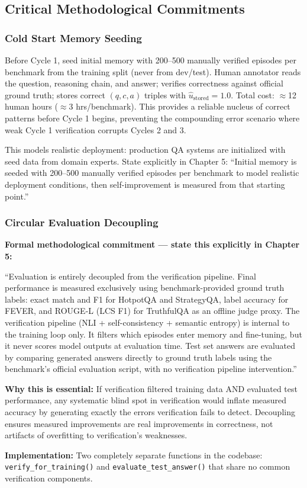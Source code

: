 \documentclass[12pt,a4paper]{article}
\theoremstyle{definition}
\newcommand{\ustored}{\hat{u}_{\text{stored}}}
\begin{document}
\subsection{Critical Methodological Commitments}

\subsubsection{Cold Start Memory Seeding}

Before Cycle 1, seed initial memory with 200--500 manually verified episodes per benchmark from the training split (never from dev/test). Human annotator reads the question, reasoning chain, and answer; verifies correctness against official ground truth; stores correct $(q, c, a)$ triples with $\ustored = 1.0$. Total cost: $\approx$12 human hours ($\approx$3 hrs/benchmark). This provides a reliable nucleus of correct patterns before Cycle 1 begins, preventing the compounding error scenario where weak Cycle 1 verification corrupts Cycles 2 and 3.

This models realistic deployment: production QA systems are initialized with seed data from domain experts. State explicitly in Chapter 5: ``Initial memory is seeded with 200--500 manually verified episodes per benchmark to model realistic deployment conditions, then self-improvement is measured from that starting point.''

\subsubsection{Circular Evaluation Decoupling}

\begin{designbox}
\textbf{Formal methodological commitment — state this explicitly in Chapter 5:}

``Evaluation is entirely decoupled from the verification pipeline. Final performance is measured exclusively using benchmark-provided ground truth labels: exact match and F1 for HotpotQA and StrategyQA, label accuracy for FEVER, and ROUGE-L (LCS F1) for TruthfulQA as an offline judge proxy. The verification pipeline (NLI + self-consistency + semantic entropy) is internal to the training loop only. It filters which episodes enter memory and fine-tuning, but it never scores model outputs at evaluation time. Test set answers are evaluated by comparing generated answers directly to ground truth labels using the benchmark's official evaluation script, with no verification pipeline intervention.''

\textbf{Why this is essential:} If verification filtered training data AND evaluated test performance, any systematic blind spot in verification would inflate measured accuracy by generating exactly the errors verification fails to detect. Decoupling ensures measured improvements are real improvements in correctness, not artifacts of overfitting to verification's weaknesses.

\textbf{Implementation:} Two completely separate functions in the codebase: \texttt{verify\_for\_training()} and \texttt{evaluate\_test\_answer()} that share no common verification components.
\end{designbox}
\end{document}
